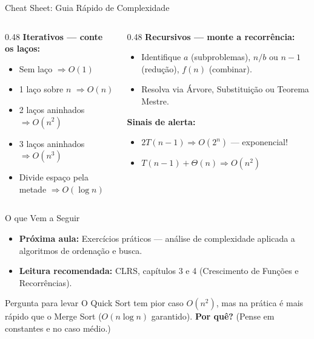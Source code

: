 \documentclass[aspectratio=169]{beamer}
\begin{document}
\begin{frame}{Cheat Sheet: Guia Rápido de Complexidade}
    \begin{columns}[T]
    \begin{column}{0.48\textwidth}
        \textbf{Iterativos --- conte os laços:}
        \begin{itemize}
            \item Sem laço $\Rightarrow O(1)$
            \item 1 laço sobre $n$ $\Rightarrow O(n)$
            \item 2 laços aninhados $\Rightarrow O(n^2)$
            \item 3 laços aninhados $\Rightarrow O(n^3)$
            \item Divide espaço pela metade $\Rightarrow O(\log n)$
        \end{itemize}
    \end{column}
    \begin{column}{0.48\textwidth}
        \textbf{Recursivos --- monte a recorrência:}
        \begin{itemize}
            \item Identifique $a$ (subproblemas), $n/b$ ou $n{-}1$ (redução), $f(n)$ (combinar).
            \item Resolva via Árvore, Substituição ou Teorema Mestre.
        \end{itemize}
        
        \vspace{0.2cm}
        \textbf{Sinais de alerta:}
        \begin{itemize}
            \item $2T(n{-}1) \Rightarrow O(2^n)$ --- exponencial!
            \item $T(n{-}1) + \Theta(n) \Rightarrow O(n^2)$
        \end{itemize}
    \end{column}
    \end{columns}
\end{frame}

\begin{frame}{O que Vem a Seguir}
    \begin{itemize}
        \item \textbf{Próxima aula:} Exercícios práticos --- análise de complexidade aplicada a algoritmos de ordenação e busca.
        \item \textbf{Leitura recomendada:} CLRS, capítulos 3 e 4 (Crescimento de Funções e Recorrências).
    \end{itemize}
    
    \vspace{0.5cm}
    \begin{block}{Pergunta para levar}
        O Quick Sort tem pior caso $O(n^2)$, mas na prática é mais rápido que o Merge Sort ($O(n \log n)$ garantido). \textbf{Por quê?} (Pense em constantes e no caso médio.)
    \end{block}
\end{frame}
\end{document}
